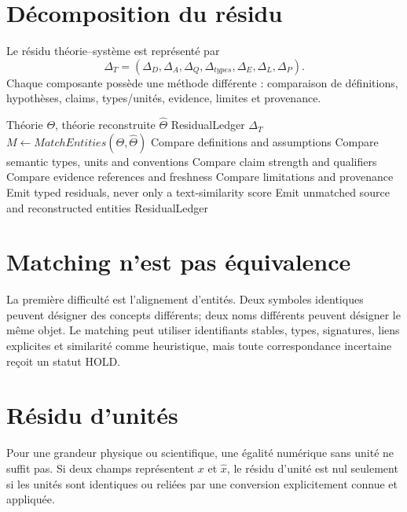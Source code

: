 \section{Décomposition du résidu}

Le résidu théorie--système est représenté par
\[
\Delta_T=(\Delta_D,\Delta_A,\Delta_Q,\Delta_{types},\Delta_E,\Delta_L,\Delta_P).
\]
Chaque composante possède une méthode différente : comparaison de définitions, hypothèses, claims, types/unités, evidence, limites et provenance.

\begin{algorithm}
\caption{Semantic diff claim-par-claim}
\begin{algorithmic}[1]
\Require Théorie $\Theta$, théorie reconstruite $\widehat\Theta$
\Ensure ResidualLedger $\Delta_T$
\State $M\gets MatchEntities(\Theta,\widehat\Theta)$
  \State Compare definitions and assumptions
  \State Compare semantic types, units and conventions
  \State Compare claim strength and qualifiers
  \State Compare evidence references and freshness
  \State Compare limitations and provenance
  \State Emit typed residuals, never only a text-similarity score
\EndFor
\State Emit unmatched source and reconstructed entities
\State \Return ResidualLedger
\end{algorithmic}
\end{algorithm}

\section{Matching n'est pas équivalence}

La première difficulté est l'alignement d'entités. Deux symboles identiques peuvent désigner des concepts différents; deux noms différents peuvent désigner le même objet. Le matching peut utiliser identifiants stables, types, signatures, liens explicites et similarité comme heuristique, mais toute correspondance incertaine reçoit un statut HOLD.

\section{Résidu d'unités}

Pour une grandeur physique ou scientifique, une égalité numérique sans unité ne suffit pas. Si deux champs représentent $x$ et $\hat x$, le résidu d'unité est nul seulement si les unités sont identiques ou reliées par une conversion explicitement connue et appliquée.


